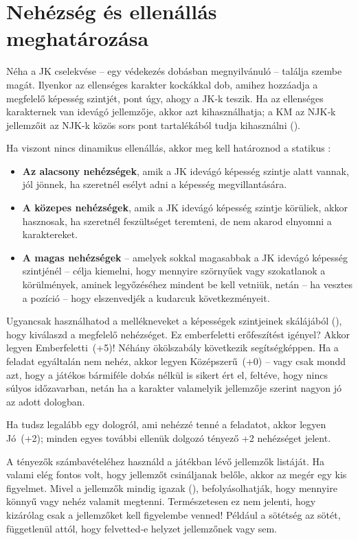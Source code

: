 \section{Nehézség és ellenállás meghatározása}

Néha a JK cselekvése – egy védekezés dobásban megnyilvánuló –  találja szembe magát. Ilyenkor az ellenséges karakter kockákkal dob, amihez hozzáadja a megfelelő képesség szintjét, pont úgy, ahogy a JK‑k teszik. Ha az ellenséges karakternek van idevágó jellemzője, akkor azt kihasználhatja; a KM az NJK‑k jellemzőit az NJK‑k közös sors pont tartalékából tudja kihasználni ().

Ha viszont nincs dinamikus ellenállás, akkor meg kell határoznod a statikus :

\begin{itemize}
    \item \textbf{Az alacsony nehézségek}, amik a JK idevágó képesség szintje alatt vannak, jól jönnek, ha szeretnél esélyt adni a képesség megvillantására.
    \item \textbf{A közepes nehézségek}, amik a JK idevágó képesség szintje körüliek, akkor hasznosak, ha szeretnél feszültséget teremteni, de nem akarod elnyomni a karaktereket.
    \item \textbf{A magas nehézségek} – amelyek sokkal magasabbak a JK idevágó képesség szintjénél – célja kiemelni, hogy mennyire szörnyűek vagy szokatlanok a körülmények, aminek legyőzéséhez mindent be kell vetniük, netán – ha vesztes a pozíció – hogy elszenvedjék a kudarcuk következményeit.
\end{itemize}

Ugyancsak használhatod a mellékneveket a képességek szintjeinek skálájából (), hogy kiválaszd a megfelelő nehézséget. Ez emberfeletti erőfeszítést igényel? Akkor legyen Emberfeletti~(+5)! Néhány ökölszabály következik segítségképpen.
Ha a feladat egyáltalán nem nehéz, akkor legyen Középszerű~(+0) – vagy csak mondd azt, hogy a játékos bármiféle dobás nélkül is sikert ért el, feltéve, hogy nincs súlyos időzavarban, netán ha a karakter valamelyik jellemzője szerint nagyon jó az adott dologban.

Ha tudsz legalább egy dologról, ami nehézzé tenné a feladatot, akkor legyen Jó~(+2); minden egyes további ellenük dolgozó tényező +2 nehézséget jelent.

A tényezők számbavételéhez használd a játékban lévő jellemzők listáját. Ha valami elég fontos volt, hogy jellemzőt csináljanak belőle, akkor az megér egy kis figyelmet. Mivel a jellemzők mindig igazak (), befolyásolhatják, hogy mennyire könnyű vagy nehéz valamit megtenni. Természetesen ez nem jelenti, hogy kizárólag csak a jellemzőket kell figyelembe venned! Például a sötétség az sötét, függetlenül attól, hogy felvetted‑e helyzet jellemzőnek vagy sem.

